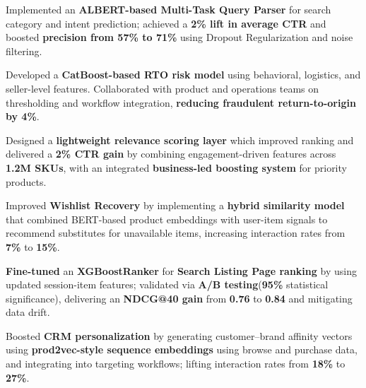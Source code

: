 \documentclass[a4paper,9pt]{extarticle} %
\newcommand{\resumeItemWithoutTitle}[1]{\item #1
}
\begin{document}
    \resumeItemWithoutTitle{Implemented an \textbf{ALBERT-based Multi-Task Query Parser} for search category and intent prediction; achieved a \textbf{2\% lift in average CTR} and boosted \textbf{precision from 57\% to 71\%} using Dropout Regularization and noise filtering.}

    \resumeItemWithoutTitle{Developed a \textbf{CatBoost-based RTO risk model} using behavioral, logistics, and seller-level features. Collaborated with product and operations teams on thresholding and workflow integration, \textbf{reducing fraudulent return-to-origin by 4\%}.}


    \resumeItemWithoutTitle{Designed a \textbf{lightweight relevance scoring layer} which improved ranking and delivered a \textbf{2\% CTR gain} by combining engagement-driven features across \textbf{1.2M SKUs}, with an integrated \textbf{business-led boosting system} for priority products.}

    \resumeItemWithoutTitle{Improved \textbf{Wishlist Recovery} by implementing a \textbf{hybrid similarity model} that combined BERT-based product embeddings with user-item signals to recommend substitutes for unavailable items, increasing interaction rates from \textbf{7\%} to \textbf{15\%}.}

    \resumeItemWithoutTitle{\textbf{Fine-tuned} an \textbf{XGBoostRanker} for \textbf{Search Listing Page ranking} by using updated session-item features; validated via \textbf{A/B testing}(\textbf{95\%} statistical significance), delivering an \textbf{NDCG@40 gain} from \textbf{0.76} to \textbf{0.84} and mitigating data drift.}

    \resumeItemWithoutTitle{Boosted \textbf{CRM personalization} by generating customer–brand affinity vectors using \textbf{prod2vec-style sequence embeddings} using browse and purchase data, and integrating into targeting workflows; lifting interaction rates from \textbf{18\%} to \textbf{27\%}.}

\end{document}
